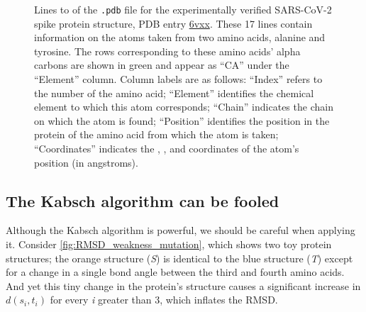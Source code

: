\begin{figure}[h]
\caption{Lines  to  of the \texttt{.pdb} file for the experimentally verified SARS-CoV-2 spike protein structure, PDB entry \href{http://www.rcsb.org/structure/6VXX}{6vxx}. These 17 lines contain information on the atoms taken from two amino acids, alanine and tyrosine. The rows corresponding to these amino acids' alpha carbons are shown in green and appear as ``CA'' under the ``Element'' column.  Column labels are as follows: ``Index'' refers to the number of the amino acid; ``Element'' identifies the chemical element to which this atom corresponds; ``Chain'' indicates the chain on which the atom is found; ``Position'' identifies the position in the protein of the amino acid from which the atom is taken; ``Coordinates'' indicates the , , and  coordinates of the atom's position (in angstroms).}
\label{fig:simplifiedPDB}
\end{figure}

\begin{note}\end{note}

\subsection{The Kabsch algorithm can be fooled}

Although the Kabsch algorithm is powerful, we should be careful when applying it. Consider \autoref{fig:RMSD_weakness_mutation}, which shows two toy protein structures; the orange structure (\textit{S}) is identical to the blue structure (\textit{T}) except for a change in a single bond angle between the third and fourth amino acids. And yet this tiny change in the protein's structure causes a significant increase in $d(s_{i}, t_{i})$ for every \textit{i} greater than 3, which inflates the RMSD.

